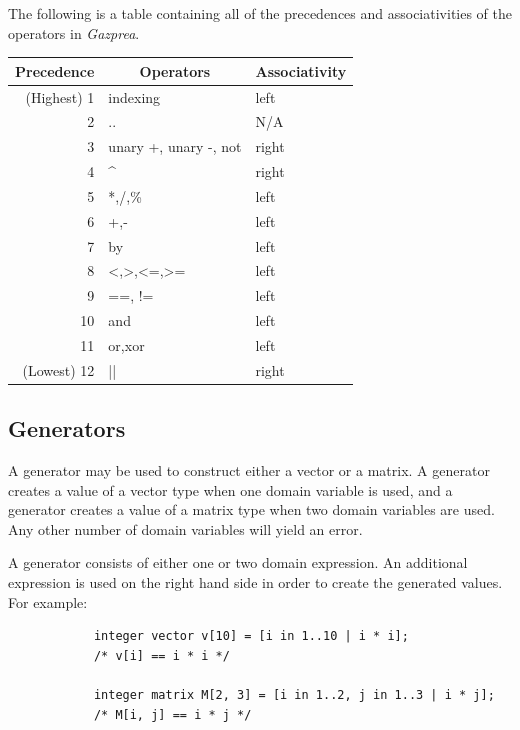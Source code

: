 \documentclass{article}
\begin{document}
		The following is a table containing all of the precedences and associativities of the operators in
		\textit{Gazprea}.

		\begin{center}
			\begin{tabular}{|r|l|l|}
				\hline
				\textbf{Precedence} &
				\multicolumn{1}{c}{\textbf{Operators}} &
				\textbf{Associativity} \\
				\hline
				(Highest) 1 & indexing              & left  \\
				2           & ..                    & N/A   \\
				3           & unary +, unary -, not & right \\
				4           & \textasciicircum      & right \\
				5           & *,/,\%                & left  \\
				6           & +,-                   & left  \\
				7           & by                    & left  \\
				8           & <,>,<=,>=             & left  \\
				9           & ==, !=                & left  \\
				10          & and                   & left  \\
				11          & or,xor                & left  \\
				(Lowest) 12 & ||                    & right \\
				\hline
			\end{tabular}
		\end{center}

	\subsection{Generators}\label{sec:generators}

		A generator may be used to construct either a vector or a matrix. A generator creates a value of a vector type
		when one domain variable is used, and a generator creates a value of a matrix type when two domain variables are
		used.  Any other number of domain variables will yield an error.

		A generator consists of either one or two domain expression. An additional expression is used on the right hand
		side in order to create the generated values. For example:

		\begin{lstlisting}
			integer vector v[10] = [i in 1..10 | i * i];
			/* v[i] == i * i */

			integer matrix M[2, 3] = [i in 1..2, j in 1..3 | i * j];
			/* M[i, j] == i * j */
		\end{lstlisting}
\end{document}
